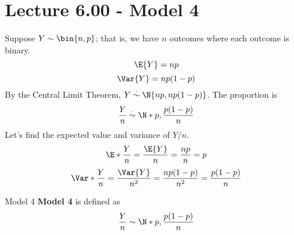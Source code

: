 \section{Lecture 6.00 - Model 4}
Suppose $ Y\sim\bin{n,p} $; that is, we have $ n $
outcomes where each outcome is binary.
\[ \E{Y}=np \]
\[ \Var{Y}=np(1-p) \]
By the Central Limit Theorem, $ Y\stackrel{\cdot}{\sim}\N{np,np(1-p)} $.
The proportion is
\[ \frac{Y}{n} \stackrel{\cdot}{\sim}\N*{p,\frac{p(1-p)}{n} } \]
Let's find the expected value and variance of $ Y/n $.
\[ \E*{\frac{Y}{n}}=\frac{\E{Y}}{n}=\frac{np}{n}=p \]
\[ \Var*{\frac{Y}{n}}=\frac{\Var{Y}}{n^2}=\frac{np(1-p)}{n^2}=\frac{p(1-p)}{n}  \]
\begin{Definition}{Model 4}{}
    \textbf{Model 4} is defined as
    \[ \frac{Y}{n} \sim \N*{p,\frac{p(1-p)}{n} } \]
\end{Definition}

